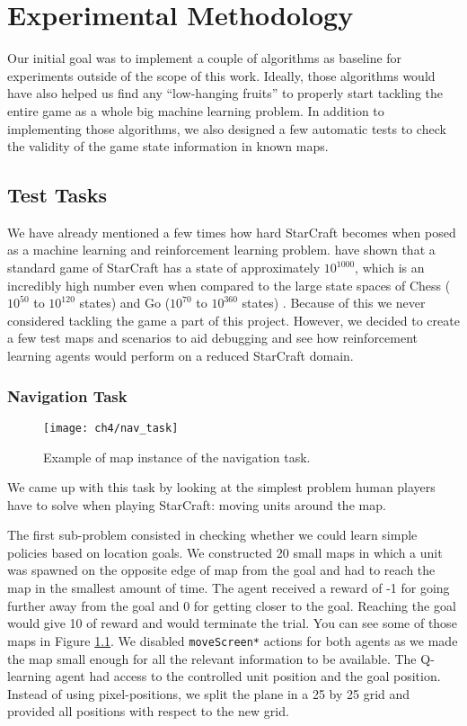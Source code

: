 \chapter{Experimental Methodology} 

Our initial goal was to implement a couple of algorithms as baseline for
experiments outside of the scope of this work. Ideally, those algorithms would
have also helped us find any ``low-hanging fruits'' to properly start
tackling the entire game as a whole big machine learning problem. In addition to
implementing those algorithms, we also designed a few automatic tests to check
the validity of the game state information in known maps.

\section{Test Tasks}

We have already mentioned a few times how hard StarCraft becomes when posed as a
machine learning and reinforcement learning problem. \cite{ontanon2013survey}
have shown that a standard game of StarCraft has a state of approximately
$10^{1000}$, which is an incredibly high number even when compared to the large
state spaces of Chess ($10^{50}$ to $10^{120}$ states) and Go ($10^{70}$ to
$10^{360}$ states) \citep{papadimitriou2003computational}. Because of this we
never considered tackling the game a part of this project. However, we decided
to create a few test maps and scenarios to aid debugging and see how
reinforcement learning agents would perform on a reduced StarCraft domain.

\subsection{Navigation Task}

\begin{figure}[h]
    \centering
    \texttt{[image: ch4/nav\_task]}
    \caption{Example of map instance of the navigation task.}
    \label{fig:nav_task}
\end{figure}

We came up with this task by looking at the simplest problem human players have
to solve when playing StarCraft: moving units around the map.

The first sub-problem consisted in checking whether we could learn simple
policies based on location goals. We constructed 20 small maps in which a unit
was spawned on the opposite edge of map from the goal and had to reach the map
in the smallest amount of time. The agent received a reward of -1 for going
further away from the goal and 0 for getting closer to the goal. Reaching the
goal would give 10 of reward and would terminate the trial. You can see some of
those maps in Figure \ref{fig:nav_task}. We disabled \texttt{moveScreen*}
actions for both agents as we made the map small enough for all the relevant
information to be available. The Q-learning agent had access to the controlled
unit position and the goal position. Instead of using pixel-positions, we split
the plane in a 25 by 25 grid and provided all positions with respect to the
new grid. 

